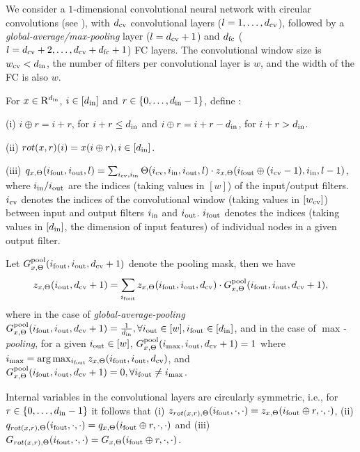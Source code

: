 We consider a $1$-dimensional convolutional neural network with circular convolutions (see ), with $d_{\text{cv}}$ convolutional layers ($l=1,\ldots,d_{\text{cv}}$), followed by a \emph{global-average/max-pooling} layer ($l=d_{\text{cv}}+1$) and $d_{\text{fc}}$ ($l=d_{\text{cv}}+2,\ldots,d_{\text{cv}}+d_{\text{fc}}+1$) FC  layers. The convolutional window size is $w_{\text{cv}}<d_{\text{in}}$, the number of filters per convolutional layer is $w$, and the width of the FC is also $w$. 
\begin{definition}
For $x\in\mathrm{R}^{d_{\text{in}}}$, $i\in[d_{\text{in}}]$ and $r\in\{0,\ldots,d_{\text{in}}-1\}$, define :

(i) $i\oplus r = i+r$, for $i+r \leq d_{\text{in}}$ and $i\oplus r =i+r-d_{\text{in}}$, for $i+r>d_{\text{in}}$.

(ii) $rot(x,r)(i)=x(i\oplus r), i\in[d_{\text{in}}]$.

(iii) $q_{x,\Theta}(i_{\text{fout}},i_{\text{out}},l)=\sum_{i_{\text{cv}},i_{\text{in}}}\Theta(i_{\text{cv}},i_{\text{in}},i_{\text{out}},l)\cdot z_{x,\Theta}(i_{\text{fout}}\oplus (i_{\text{cv}}-1),i_{\text{in}},l-1)$, where $i_{\text{in}}/i_{\text{out}}$ are the indices (taking values in $[w]$) of the input/output filters. $i_{\text{cv}}$ denotes the indices of the convolutional window (taking values in $[w_{\text{cv}}]$) between input and output filters $i_{\text{in}}$ and $i_{\text{out}}$. $i_{\text{fout}}$ denotes the indices (taking values in $[d_{\text{in}}]$, the dimension of input features) of individual nodes in a given output filter.
\end{definition}
\begin{definition}[Pooling]
Let $G^{\text{pool}}_{x,\Theta}(i_{\text{fout}},i_{\text{out}},d_{\text{cv}}+1)$ denote the pooling mask, then we have
\begin{align*}
z_{x,\Theta}(i_{\text{out}}, d_{\text{cv}}+1) =\sum_{i_{\text{fout}}} z_{x,\Theta}(i_{\text{fout}},i_{\text{out}},d_{\text{cv}})\cdot G^{\text{pool}}_{x,\Theta}(i_{\text{fout}},i_{\text{out}},d_{\text{cv}}+1),
\end{align*}
where in the case of \emph{global-average-pooling} $G^{\text{pool}}_{x,\Theta}(i_{\text{fout}},i_{\text{out}},d_{\text{cv}}+1)=\frac{1}{d_{\text{in}}},\forall i_{\text{out}}\in[w], i_{\text{fout}}\in[d_{\text{in}}]$, and in the case of \emph{$\max$-pooling},  
for a given $i_{\text{out}}\in[w]$, $G^{\text{pool}}_{x,\Theta}(i_{\max},i_{\text{out}},d_{\text{cv}}+1)=1$ where $i_{\max}=\arg\max_{i_{\text{fout}}}z_{x,\Theta}(i_{\text{fout}},i_{\text{out}},d_{\text{cv}})$, and $G^{\text{pool}}_{x,\Theta}(i_{\text{fout}},i_{\text{out}},d_{\text{cv}}+1)=0,\forall i_{\text{fout}}\neq i_{\max}$.
\end{definition}

\begin{proposition}\label{prop:rot}
Internal variables in the convolutional layers are circularly symmetric,  i.e., for $r\in\{0,\ldots,d_{\text{in}}-1\}$ it follows that (i) $z_{rot(x,r),\Theta}(i_{\text{fout}},\cdot,\cdot) = z_{x,\Theta}(i_{\text{fout}} \oplus r,\cdot,\cdot)$, (ii) $q_{rot(x,r),\Theta}(i_{\text{fout}},\cdot,\cdot) = q_{x,\Theta}(i_{\text{fout}} \oplus r,\cdot,\cdot)$ and (iii) $G_{rot(x,r),\Theta}(i_{\text{fout}},\cdot,\cdot) = G_{x,\Theta}(i_{\text{fout}} \oplus r,\cdot,\cdot)$.
\end{proposition}

